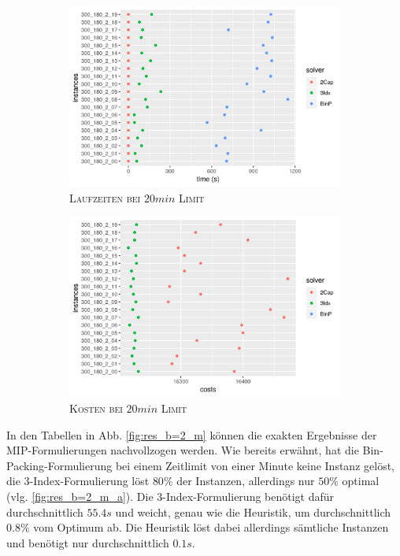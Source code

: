 \begin{figure}[H]
\centering
\begin{subfigure}[b]{0.4\textwidth}
\centering
\includegraphics[width=1.3\textwidth]{img/solver_instance_time_b=2_m_1200s.png}
\caption{\textsc{Laufzeiten bei $20min$ Limit}}
\label{fig:b=2_m_runtimes}
\end{subfigure}
\hfill
\begin{subfigure}[b]{0.4\textwidth}
\centering
\includegraphics[width=1.3\textwidth]{img/solver_instance_cost_b=2_m_1200s.png}
\caption{\textsc{Kosten bei $20min$ Limit}}
\label{fig:b=2_m_costs}
\end{subfigure}
\caption{}
\label{fig:res_plots_b=2_m}
\end{figure}

In den Tabellen in Abb. \ref{fig:res_b=2_m} können die exakten Ergebnisse der MIP-Formulierungen nachvollzogen werden.
Wie bereits erwähnt, hat die Bin-Packing-Formulierung bei einem Zeitlimit von einer Minute keine Instanz gelöst, die 3-Index-Formulierung löst
$80 \%$ der Instanzen, allerdings nur $50 \%$ optimal (vlg. \ref{fig:res_b=2_m_a}). Die 3-Index-Formulierung benötigt dafür durchschnittlich
$55.4s$ und weicht, genau wie die Heuristik, um durchschnittlich $0.8 \%$ vom Optimum ab. Die Heuristik löst dabei allerdings sämtliche Instanzen
und benötigt nur durchschnittlich $0.1s$.


